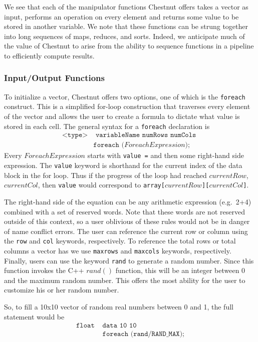 \documentclass[twocolumn]{article}
\renewcommand{\|}{\origbar} %
\newcommand{\code}[1]{\texttt{#1}}
\begin{document}
We see that each of the manipulator functions Chestnut offers takes a vector as input, performs an operation on every element and returns some value to be stored in another variable. We note that these functions can be strung together into long sequences of maps, reduces, and sorts. Indeed, we anticipate much of the value of Chestnut to arise from the ability to sequence functions in a pipeline to efficiently compute results.

\subsubsection{Input/Output Functions}
\label{sec:iofunctions}

To initialize a vector, Chestnut offers two options, one of which is the \code{foreach} construct. This is a simplified for-loop construction that traverses every element of the vector and allows the user to create a formula to dictate what value is stored in each cell. The general syntax for a \code{foreach} declaration is
\begin{align*}
  \code{<type>}& \code{ variableName numRows numCols } \\ &\code{foreach ($ForeachExpression$);}
\end{align*}
Every $ForeachExpression$ starts with \code{value =} and then some right-hand side expression. The \code{value} keyword is shorthand for the current index of the data block in the for loop. Thus if the progress of the loop had reached $currentRow$, $currentCol$, then \code{value} would correspond to \code{array[$currentRow$][$currentCol$]}.

The right-hand side of the equation can be any arithmetic expression (e.g.\ 2+4) combined with a set of reserved words. Note that these words are not reserved outside of this context, so a user oblivious of these rules would not be in danger of name conflict errors. The user can reference the current row or column using the \code{row} and \code{col} keywords, respectively. To reference the total rows or total columns a vector has we use \code{maxrows} and \code{maxcols} keywords, respectively. Finally, users can use the keyword \code{rand} to generate a random number. Since this function invokes the C++ $rand()$ function, this will be an integer between 0 and the maximum random number. This offers the most ability for the user to customize his or her random number. 

So, to fill a 10x10 vector of random real numbers between 0 and 1, the full statement would be
\begin{align*}
  \code{float } &\code{data 10 10 } \\ &\code{foreach (rand/RAND\_MAX);}
\end{align*}
\end{document}
